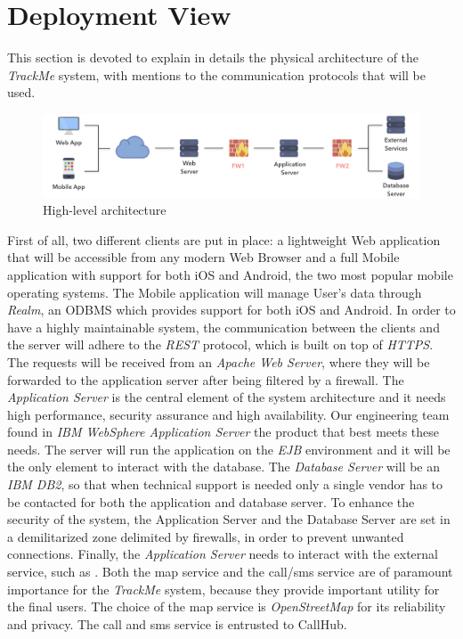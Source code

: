 \section{Deployment View}

This section is devoted to explain in details the physical architecture of the \textit{TrackMe} system, with mentions to the communication protocols that will be used.


\begin{figure}[H]

\includegraphics[scale=0.32,keepaspectratio]{./Pictures/high-level-firewall.png}
\centering
\caption{High-level architecture}

\end{figure}

First of all, two different clients are put in place: a lightweight Web application that will be accessible from any modern Web Browser and a full Mobile application with support for both iOS and Android, the two most popular mobile operating systems. The Mobile application will manage User's data through \textit{Realm}, an ODBMS which provides support for both iOS and Android. In order to have a highly maintainable system, the communication between the clients and the server will adhere to the \textit{REST} protocol, which is built on top of \textit{HTTPS}. 
The requests will be received from an \textit{Apache Web Server}, where they will be forwarded to the application server after being filtered by a firewall.
The \textit{Application Server} is the central element of the system architecture and it needs high performance, security assurance and high availability. Our engineering team found in \textit{IBM WebSphere Application Server} the product that best meets these needs. The server will run the application on the \textit{EJB} environment and it will be the only element to interact with the database. The \textit{Database Server} will be an \textit{IBM DB2}, so that when technical support is needed only a single vendor has to be contacted for both the application and database server. To enhance the security of the system, the Application Server and the Database Server are set in a demilitarized zone delimited by firewalls, in order to prevent unwanted connections.
Finally, the \textit{Application Server} needs to interact with the external service, such as . Both the map service and the call/sms service are of paramount importance for the \textit{TrackMe} system, because they provide important utility for the final users. The choice of the map service is \textit{OpenStreetMap} for its reliability and privacy. The call and sms service is entrusted to CallHub.

